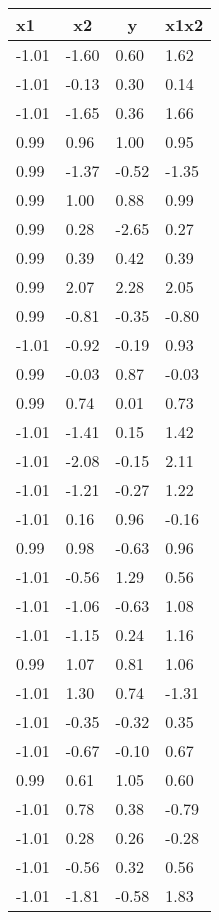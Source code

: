 \documentclass[
  doc,draftall]{apa6}
\begin{document}
\begin{table}[tbp]

\begin{center}
\begin{threeparttable}

\caption{\label{tab:unnamed-chunk-1}}

\begin{tabular}{llll}
\toprule
x1 & \multicolumn{1}{c}{x2} & \multicolumn{1}{c}{y} & \multicolumn{1}{c}{x1x2}\\
\midrule
-1.01 & -1.60 & 0.60 & 1.62\\
-1.01 & -0.13 & 0.30 & 0.14\\
-1.01 & -1.65 & 0.36 & 1.66\\
0.99 & 0.96 & 1.00 & 0.95\\
0.99 & -1.37 & -0.52 & -1.35\\
0.99 & 1.00 & 0.88 & 0.99\\
0.99 & 0.28 & -2.65 & 0.27\\
0.99 & 0.39 & 0.42 & 0.39\\
0.99 & 2.07 & 2.28 & 2.05\\
0.99 & -0.81 & -0.35 & -0.80\\
-1.01 & -0.92 & -0.19 & 0.93\\
0.99 & -0.03 & 0.87 & -0.03\\
0.99 & 0.74 & 0.01 & 0.73\\
-1.01 & -1.41 & 0.15 & 1.42\\
-1.01 & -2.08 & -0.15 & 2.11\\
-1.01 & -1.21 & -0.27 & 1.22\\
-1.01 & 0.16 & 0.96 & -0.16\\
0.99 & 0.98 & -0.63 & 0.96\\
-1.01 & -0.56 & 1.29 & 0.56\\
-1.01 & -1.06 & -0.63 & 1.08\\
-1.01 & -1.15 & 0.24 & 1.16\\
0.99 & 1.07 & 0.81 & 1.06\\
-1.01 & 1.30 & 0.74 & -1.31\\
-1.01 & -0.35 & -0.32 & 0.35\\
-1.01 & -0.67 & -0.10 & 0.67\\
0.99 & 0.61 & 1.05 & 0.60\\
-1.01 & 0.78 & 0.38 & -0.79\\
-1.01 & 0.28 & 0.26 & -0.28\\
-1.01 & -0.56 & 0.32 & 0.56\\
-1.01 & -1.81 & -0.58 & 1.83\\

\end{tabular}
\end{threeparttable}
\end{center}
\end{table}
\end{document}
